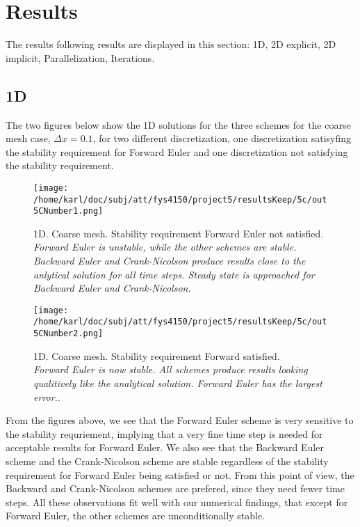 \documentclass{article}
\begin{document}
\section{Results}
The results following results are displayed in this section: 1D, 2D explicit, 2D implicit, Parallelization, Iterations.

\subsection{1D}

The two figures below show the 1D solutions for the three schemes for the coarse mesh case, $\Delta x = 0.1$, for two different discretization, one discretization satisyfing the stability requirement for Forward Euler and one discretization not satisfying the stability requirement.

\begin{minipage}{.45\textwidth} 
	\begin{figure}[H]
		\centering
		\texttt{[image: /home/karl/doc/subj/att/fys4150/project5/resultsKeep/5c/out5CNumber1.png]}
		\caption{1D. Coarse mesh. Stability requirement Forward Euler not satisfied.\\ \textit{Forward Euler is unstable, while the other schemes are stable. Backward Euler and Crank-Nicolson produce results close to the anlytical solution for all time steps. Steady state is approached for Backward Euler and Crank-Nicolson.}}
		\label{1}
	\end{figure}
\end{minipage}\hfill
\begin{minipage}{.45\textwidth} 
	\begin{figure}[H]
		\centering
		\texttt{[image: /home/karl/doc/subj/att/fys4150/project5/resultsKeep/5c/out5CNumber2.png]}
		\caption{1D. Coarse mesh. Stability requirement Forward satisfied.\\ \textit{Forward Euler is now stable. All schemes produce results looking qualitively like the analytical solution. Forward Euler has the largest error.}.}
		\label{fig:unzoomed}
	\end{figure}
\end{minipage}\hfill
\vspace{2ex}

From the figures above, we see that the Forward Euler scheme is very sensitive to the stability requriement, implying that a very fine time step is needed for acceptable results for Forward Euler. We also see that the Backward Euler scheme and the Crank-Nicolson scheme are stable regardless of the stability requirement for Forward Euler being satisfied or not. From this point of view, the Backward and Crank-Nicolson schemes are prefered, since they need fewer time steps. All these observations fit well with our numerical findings, that except for Forward Euler, the other schemes are unconditionally stable.\\
\end{document}
